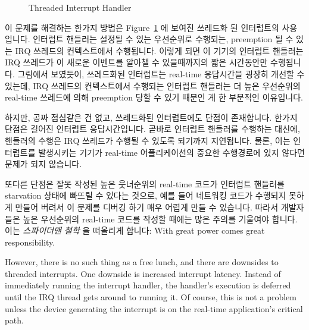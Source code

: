 \begin{figure}[tb]
\centering
{}
\caption{Threaded Interrupt Handler}
\label{fig:rt:Threaded Interrupt Handler}
\end{figure}

이 문제를 해결하는 한가지 방법은
Figure~\ref{fig:rt:Threaded Interrupt Handler} 에 보여진 쓰레드화 된 인터럽트의
사용입니다.
인터럽트 핸들러는 설정될 수 있는 우선순위로 수행되는, preemption 될 수 있는 IRQ
쓰레드의 컨텍스트에서 수행됩니다.
이렇게 되면 이 기기의 인터럽트 핸들러는 IRQ 쓰레드가 이 새로운 이벤트를 알아챌
수 있을때까지의 짧은 시간동안만 수행됩니다.
그림에서 보였듯이, 쓰레드화된 인터럽트는 real-time 응답시간을 굉장히 개선할 수
있는데, IRQ 쓰레드의 컨텍스트에서 수행되는 인터럽트 핸들러는 더 높은 우선순위의
real-time 쓰레드에 의해 preemption 당할 수 있기 때문인 게 한 부분적인
이유입니다.

하지만, 공짜 점심같은 건 없고, 쓰레드화된 인터럽트에도 단점이 존재합니다.
한가지 단점은 길어진 인터럽트 응답시간입니다.
곧바로 인터럽트 핸들러를 수행하는 대신에, 핸들러의 수행은 IRQ 쓰레드가 수행될
수 있도록 되기까지 지연됩니다.
물론, 이는 인터럽트를 발생시키는 기기가 real-time 어플리케이션의 중요한
수행경로에 있지 않다면 문제가 되지 않습니다.

또다른 단점은 잘못 작성된 높은 웃너순위의 real-time 코드가 인터럽트 핸들러를
starvation 상태에 빠뜨릴 수 있다는 것으로, 예를 들어 네트워킹 코드가 수행되지
못하게 만들어 버려서 이 문제를 디버깅 하기 매우 어렵게 만들 수 있습니다.
따라서 개발자들은 높은 우선순위의 real-time 코드를 작성할 때에는 많은 주의를
기울여야 합니다.
이는 \emph{스파이더맨 철학} 을 떠올리게 합니다: With great power comes great
responsibility.
\iffalse

However, there is no such thing as a free lunch, and there are downsides
to threaded interrupts.
One downside is increased interrupt latency.
Instead of immediately running the interrupt handler, the handler's execution
is deferred until the IRQ thread gets around to running it.
Of course, this is not a problem unless the device generating the interrupt
is on the real-time application's critical path.

